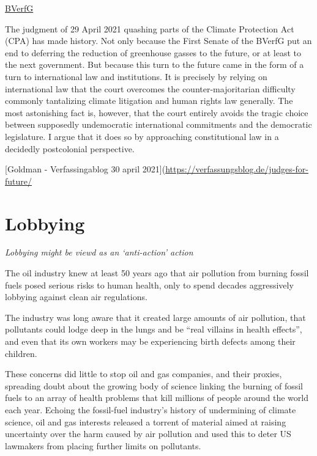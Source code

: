 \documentclass[
]{book}
\begin{document}
\href{https://www.bundesverfassungsgericht.de/SharedDocs/Pressemitteilungen/EN/2021/bvg21-031.html}{BVerfG}

The judgment of 29 April 2021 quashing parts of the Climate Protection Act (CPA) has made history. Not only because the First Senate of the BVerfG put an end to deferring the reduction of greenhouse gasses to the future, or at least to the next government. But because this turn to the future came in the form of a turn to international law and institutions. It is precisely by relying on international law that the court overcomes the counter-majoritarian difficulty commonly tantalizing climate litigation and human rights law generally. The most astonishing fact is, however, that the court entirely avoids the tragic choice between supposedly undemocratic international commitments and the democratic legislature. I argue that it does so by approaching constitutional law in a decidedly postcolonial perspective.

{[}Goldman - Verfassingablog 30 april 2021{]}(\url{https://verfassungsblog.de/judges-for-future/}

\hypertarget{lobbying}{%
\chapter{Lobbying}\label{lobbying}}

\emph{Lobbying might be viewd as an `anti-action' action}

The oil industry knew at least 50 years ago that air pollution from burning fossil fuels posed serious risks to human health, only to spend decades aggressively lobbying against clean air regulations.

The industry was long aware that it created large amounts of air pollution, that pollutants could lodge deep in the lungs and be ``real villains in health effects'', and even that its own workers may be experiencing birth defects among their children.

These concerns did little to stop oil and gas companies, and their proxies, spreading doubt about the growing body of science linking the burning of fossil fuels to an array of health problems that kill millions of people around the world each year. Echoing the fossil-fuel industry's history of undermining of climate science, oil and gas interests released a torrent of material aimed at raising uncertainty over the harm caused by air pollution and used this to deter US lawmakers from placing further limits on pollutants.
\end{document}
